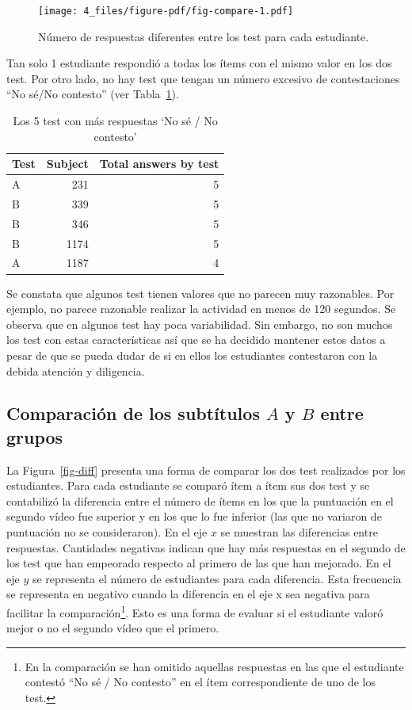 \documentclass[
  12pt,
  a4paper,
  extrafontsizes,
  onecolumn,
  openright,
  table]{memoir}
\begin{document}
\begin{figure}[h]

{\centering \texttt{[image: 4\_files/figure-pdf/fig-compare-1.pdf]}

}

\caption{\label{fig-compare}Número de respuestas diferentes entre los
test para cada estudiante.}

\end{figure}

Tan solo 1 estudiante respondió a todas los ítems con el mismo valor en
los dos test. Por otro lado, no hay test que tengan un número excesivo
de contestaciones \enquote{No sé/No contesto} (ver
Tabla~\ref{tbl-noanswer}).

\hypertarget{tbl-noanswer}{}
\begin{longtable}{lrr}
\caption{\label{tbl-noanswer}Los 5 test con más respuestas `No sé / No contesto' }\tabularnewline

\toprule
Test & Subject & Total answers by test \\ 
\midrule
A & 231 & 5 \\ 
B & 339 & 5 \\ 
B & 346 & 5 \\ 
B & 1174 & 5 \\ 
A & 1187 & 4 \\ 
\bottomrule
\end{longtable}

Se constata que algunos test tienen valores que no parecen muy
razonables. Por ejemplo, no parece razonable realizar la actividad en
menos de 120 segundos. Se observa que en algunos test hay poca
variabilidad. Sin embargo, no son muchos los test con estas
características así que se ha decidido mantener estos datos a pesar de
que se pueda dudar de si en ellos los estudiantes contestaron con la
debida atención y diligencia.

\hypertarget{sec-eda-3}{%
\subsection{\texorpdfstring{Comparación de los subtítulos \(A\) y \(B\)
entre
grupos}{Comparación de los subtítulos A y B entre grupos}}\label{sec-eda-3}}

La Figura~\ref{fig-diff} presenta una forma de comparar los dos test
realizados por los estudiantes. Para cada estudiante se comparó ítem a
ítem sus dos test y se contabilizó la diferencia entre el número de
ítems en los que la puntuación en el segundo vídeo fue superior y en los
que lo fue inferior (las que no variaron de puntuación no se
consideraron). En el eje \(x\) se muestran las diferencias entre
respuestas. Cantidades negativas indican que hay más respuestas en el
segundo de los test que han empeorado respecto al primero de las que han
mejorado. En el eje \(y\) se representa el número de estudiantes para
cada diferencia. Esta frecuencia se representa en negativo cuando la
diferencia en el eje x sea negativa para facilitar la
comparación\footnote{En la comparación se han omitido aquellas
  respuestas en las que el estudiante contestó \enquote{No sé / No
  contesto} en el ítem correspondiente de uno de los test.}. Esto es una
forma de evaluar si el estudiante valoró mejor o no el segundo vídeo que
el primero.
\end{document}
